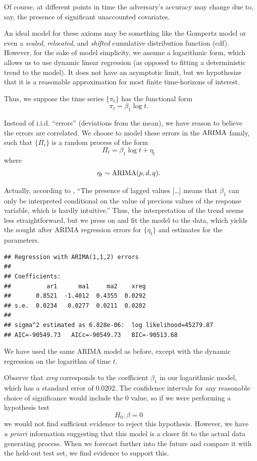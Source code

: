 \documentclass[final,
  11pt,
]{article}
\begin{document}
Of course, at different points in time the adversary's accuracy may
change due to, say, the presence of significant unaccounted covariates.

An ideal model for these axioms may be something like the Gompertz model
or even a \emph{scaled}, \emph{relocated}, and \emph{shifted} cumulative
distribution function (cdf). However, for the sake of model simplicity,
we assume a logarithmic form, which allows us to use dynamic linear regression
(as opposed to fitting a deterministic trend to the model).
It does not have an asymptotic limit, but we hypothesize that it is a
reasonable approximation for most finite time-horizons of interest.

Thus, we suppose the time series \(\{\pi_t\}\) has the functional form
\[
  \pi_t = \beta_1 \log t.
\]

Instead of i.i.d. ``errors'' (deviations from the mean), we have reason
to believe the errors are correlated. We choose to model these errors in
the \(\operatorname{ARIMA}\) family, such that \(\{\Pi_t\}\) is a random process of
the form
\[
  \Pi_t = \beta_1 \log t + \eta_t
\] where \[
  \eta_t \sim \operatorname{ARIMA}(p,d,q).
\]

Actually, according to \cite{rob_arimax},
``The presence of lagged values {[}\ldots{]} means that \(\beta_1\) can
only be interpreted conditional on the value of previous values of the
response variable, which is hardly intuitive.''
Thus, the interpretation of the trend seems less straightforward,
but we press on and fit the model to the data, which yields the
sought after ARIMA regression errors for \(\{\eta_t\}\) and estimates
for the parameters.

\begin{verbatim}
## Regression with ARIMA(1,1,2) errors 
## 
## Coefficients:
##          ar1      ma1     ma2    xreg
##       0.8521  -1.4012  0.4355  0.0292
## s.e.  0.0234   0.0277  0.0211  0.0202
## 
## sigma^2 estimated as 6.828e-06:  log likelihood=45279.87
## AIC=-90549.73   AICc=-90549.73   BIC=-90513.68
\end{verbatim}

We have used the same ARIMA model as before, except with the dynamic
regression on the logarithm of time \(t\).

Observe that \emph{xreg} corresponds to the coefficient $\beta_1$
in our logarithmic model, which has a standard error of $0.0202$.
The confidence intervals for any reasonable choice of significance
would include the $0$ value, so if we were performing a hypothesis
test
$$
    H_0 : \beta = 0
$$
we would not find sufficient evidence to reject this hypothesis.
However, we have \emph{a priori} information suggesting that
this model is a closer fit to the actual data generating process.
When we forecast further into the future and compare it with
the held-out test set, we find evidence to support this.
\end{document}
